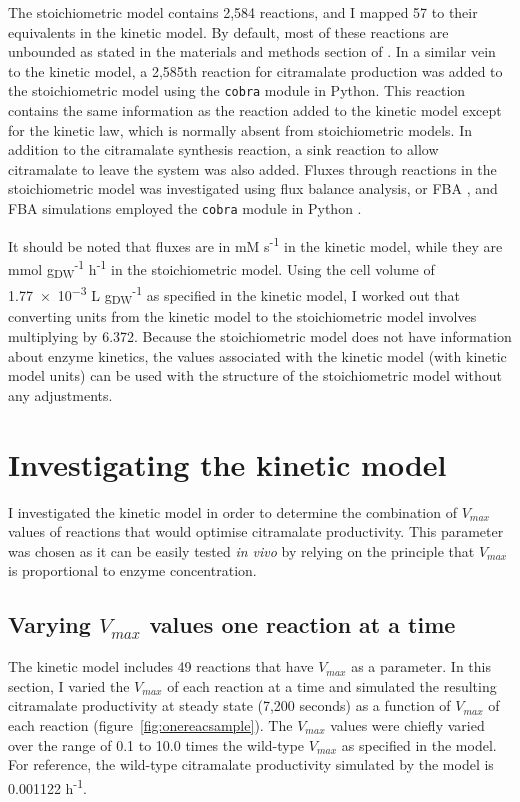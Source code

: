 \documentclass[parskip=full, numbers=noenddot]{scrreprt}
\begin{document}
The stoichiometric model contains 2,584 reactions, and I mapped 57 to their equivalents in the kinetic model. By default, most of these reactions are unbounded as stated in the materials and methods section of \citet{orth_comprehensive_2011}.
In a similar vein to the kinetic model, a 2,585th reaction for citramalate production was added to the stoichiometric model using the \texttt{cobra} module in Python. This reaction contains the same information as the reaction added to the kinetic model except for the kinetic law, which is normally absent from stoichiometric models. In addition to the citramalate synthesis reaction, a sink reaction to allow citramalate to leave the system was also added.
Fluxes through reactions in the stoichiometric model was investigated using flux balance analysis, or FBA \citep{orth_what_2010}, and FBA simulations employed the \texttt{cobra} module in Python \citep{ebrahim_cobrapy:_2013}.

It should be noted that fluxes are in mM s\textsuperscript{-1} in the kinetic model, while they are mmol g\textsubscript{DW}\textsuperscript{-1} h\textsuperscript{-1} in the stoichiometric model. Using the cell volume of \num{1.77e-3} L g\textsubscript{DW}\textsuperscript{-1} as specified in the kinetic model, I worked out that converting units from the kinetic model to the stoichiometric model involves multiplying by 6.372. Because the stoichiometric model does not have information about enzyme kinetics, the values associated with the kinetic model (with kinetic model units) can be used with the structure of the stoichiometric model without any adjustments.

\chapter{Investigating the kinetic model}
\label{ch:kinetic}

I investigated the kinetic model in order to determine the combination of $V_{max}$ values of reactions that would optimise citramalate productivity. This parameter was chosen as it can be easily tested \emph{in vivo} by relying on the principle that $V_{max}$ is proportional to enzyme concentration.

\section{Varying $V_{max}$ values one reaction at a time}
\label{sec:onereac}

The kinetic model includes 49 reactions that have $V_{max}$ as a parameter. In this section, I varied the $V_{max}$ of each reaction at a time and simulated the resulting citramalate productivity at steady state (7,200 seconds) as a function of $V_{max}$ of each reaction (figure~\ref{fig:onereacsample}). The $V_{max}$ values were chiefly varied over the range of 0.1 to 10.0 times the wild-type $V_{max}$ as specified in the model.
For reference, the wild-type citramalate productivity simulated by the model is 0.001122 h\textsuperscript{-1}.
\end{document}
